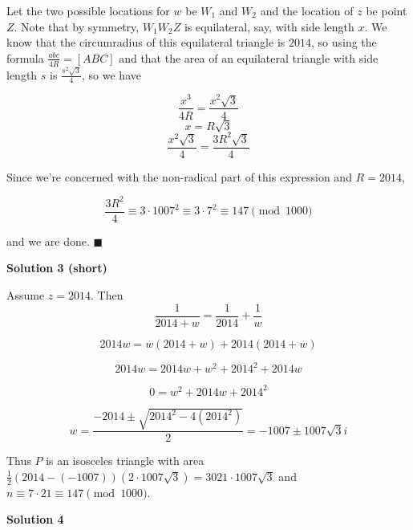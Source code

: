 \begin{enumerate}
 Let the two possible locations for $w$ be $W_1$ and $W_2$ and the location of $z$ be point $Z$. Note that by symmetry, $W_1W_2Z$ is equilateral, say, with side length $x$. We know that the circumradius of this equilateral triangle is $2014$, so using the formula $\frac{abc}{4R} = [ABC]$ and that the area of an equilateral triangle with side length $s$ is $\frac{s^2\sqrt{3}}{4}$, so we have

 
 \[\frac{x^3}{4R} = \frac{x^2\sqrt{3}}{4}\]
 \[x = R \sqrt{3}\]
 \[\frac{x^2\sqrt{3}}{4} = \frac{3R^2 \sqrt{3}}{4}\]

 Since we're concerned with the non-radical part of this expression and $R = 2014$,

 
 \[\frac{3R^2}{4} \equiv 3 \cdot 1007^2 \equiv 3 \cdot 7^2 \equiv \boxed{147} \pmod{1000}\]

 and we are done. $\blacksquare$




\textbf{Solution 3 (short)}

Assume $z = 2014$. Then
 \[\frac{1}{2014 + w} = \frac{1}{2014} + \frac{1}{w}\]

 \[2014w = w(2014 + w) + 2014(2014 + w)\]

 \[2014w = 2014w + w^2 + 2014^2 + 2014w\]

 \[0 = w^2 + 2014w + 2014^2\]

 \[w = \frac{-2014 \pm \sqrt{2014^2 - 4(2014^2)}}{2} = -1007 \pm 1007\sqrt{3}i\]

 Thus $P$ is an isosceles triangle with area $\frac{1}{2}(2014 - (-1007))(2\cdot 1007\sqrt{3}) = 3021\cdot 1007\sqrt{3}$ and $n \equiv 7\cdot 21\equiv \boxed{147} \pmod{1000}.$




\textbf{Solution 4}


\end{enumerate}
